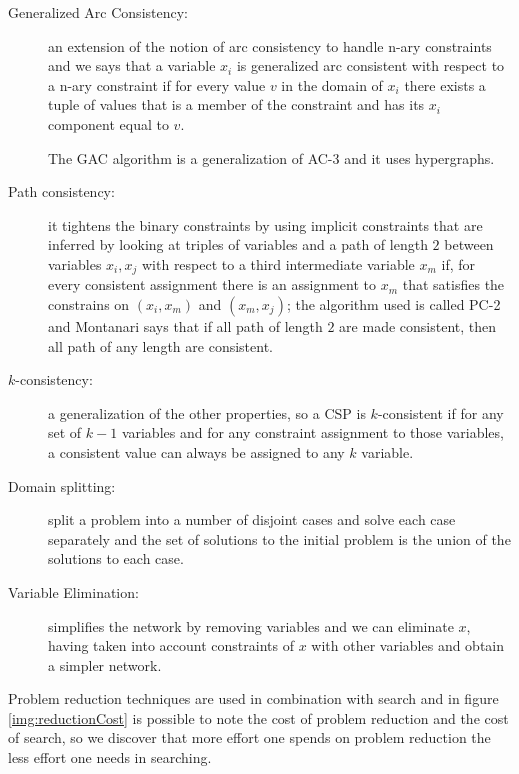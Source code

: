 \begin{description}
  \item [Generalized Arc Consistency: ] an extension of the notion of arc 
	  consistency to handle n-ary constraints and we says that a variable
	  $x_i$ is generalized arc consistent with respect to a n-ary constraint
	  if for every value $v$ in the domain of $x_i$ there exists a tuple
	  of values that is a member of the constraint and has its $x_i$ 
	  component equal to $v$.

	  The GAC algorithm is a generalization of AC-3 and it uses hypergraphs.
	
  \item [Path consistency: ] it tightens the binary constraints by using 
	  implicit constraints that are inferred by looking at triples of 
	  variables and a path of length $2$ between variables $x_i, x_j$
	  with respect to a third intermediate variable $x_m$ if, for every
	  consistent assignment there is an assignment to $x_m$ that satisfies
	  the constrains on $(x_i, x_m)$ and $(x_m, x_j)$; the algorithm
	  used is called PC-2 and Montanari says that if all path of length $2$
	  are made consistent, then all path of any length are consistent.

  \item [$k$-consistency:] a generalization of the other properties, so a CSP
	  is $k$-consistent if for any set of $k-1$ variables and for any 
	  constraint assignment to those variables, a consistent value can 
	  always be assigned to any $k$ variable.

  \item [Domain splitting: ] split a problem into a number of disjoint cases
	  and solve each case separately and the set of solutions to the 
	  initial problem is the union of the solutions to each case.
	
  \item [Variable Elimination: ] simplifies the network by removing variables
	  and we can eliminate $x$, having taken into account constraints
	  of $x$ with other variables and obtain a simpler network.
\end{description}

Problem reduction techniques are used in combination with search and in figure
\ref{img:reductionCost} is possible to note the cost of problem reduction 
and the cost of search, so we discover that more effort one spends on 
problem reduction the less effort one needs in searching.

